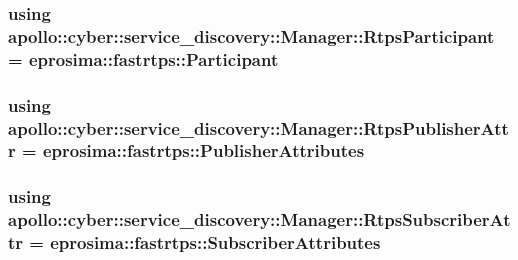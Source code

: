 \hypertarget{classapollo_1_1cyber_1_1service__discovery_1_1Manager_a7576b9ac293ff99af06e30a971df5dce}{
\subsubsection[{Rtps\-Participant}]{\setlength{\rightskip}{0pt plus 5cm}using {\bf apollo\-::cyber\-::service\-\_\-discovery\-::\-Manager\-::\-Rtps\-Participant} =  eprosima\-::fastrtps\-::\-Participant}}\label{classapollo_1_1cyber_1_1service__discovery_1_1Manager_a7576b9ac293ff99af06e30a971df5dce}
\hypertarget{classapollo_1_1cyber_1_1service__discovery_1_1Manager_a1b8464bc115c49a16a0d943c7cb5ef32}{
\subsubsection[{Rtps\-Publisher\-Attr}]{\setlength{\rightskip}{0pt plus 5cm}using {\bf apollo\-::cyber\-::service\-\_\-discovery\-::\-Manager\-::\-Rtps\-Publisher\-Attr} =  eprosima\-::fastrtps\-::\-Publisher\-Attributes}}\label{classapollo_1_1cyber_1_1service__discovery_1_1Manager_a1b8464bc115c49a16a0d943c7cb5ef32}
\hypertarget{classapollo_1_1cyber_1_1service__discovery_1_1Manager_ac16fc5e01d6d107cbb865d6d8127f622}{
\subsubsection[{Rtps\-Subscriber\-Attr}]{\setlength{\rightskip}{0pt plus 5cm}using {\bf apollo\-::cyber\-::service\-\_\-discovery\-::\-Manager\-::\-Rtps\-Subscriber\-Attr} =  eprosima\-::fastrtps\-::\-Subscriber\-Attributes}}\label{classapollo_1_1cyber_1_1service__discovery_1_1Manager_ac16fc5e01d6d107cbb865d6d8127f622}



